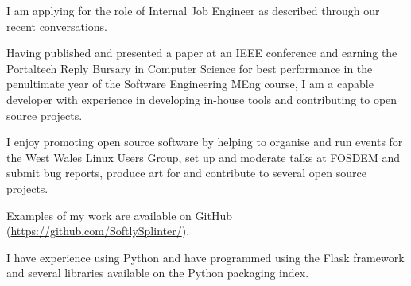 \documentclass[10pt,stdletter,dateno,sigleft]{newlfm} %
\begin{document}
\begin{newlfm}




I am applying for the role of Internal Job Engineer as described through our recent conversations.


Having published and presented a paper at an IEEE conference and earning the
Portaltech Reply Bursary in Computer Science for best performance in the
penultimate year of the Software Engineering MEng course, I am a capable
developer with experience in developing in-house tools and contributing to
open source projects.

I enjoy promoting open source software by helping to organise and run events
for the West Wales Linux Users Group, set up and moderate talks at FOSDEM and
submit bug reports, produce art for and contribute to several open source 
projects.

Examples of my work are available on GitHub 
(\url{https://github.com/SoftlySplinter/}).

I have experience using Python and have programmed using the Flask framework
and several libraries available on the Python packaging index.


\end{newlfm}
\end{document}
